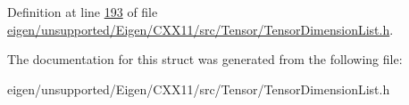 Definition at line \hyperlink{eigen_2unsupported_2_eigen_2_c_x_x11_2src_2_tensor_2_tensor_dimension_list_8h_source_l00193}{193} of file \hyperlink{eigen_2unsupported_2_eigen_2_c_x_x11_2src_2_tensor_2_tensor_dimension_list_8h_source}{eigen/unsupported/\+Eigen/\+C\+X\+X11/src/\+Tensor/\+Tensor\+Dimension\+List.\+h}.



The documentation for this struct was generated from the following file\+:\begin{DoxyCompactItemize}
\item 
eigen/unsupported/\+Eigen/\+C\+X\+X11/src/\+Tensor/\+Tensor\+Dimension\+List.\+h\end{DoxyCompactItemize}
